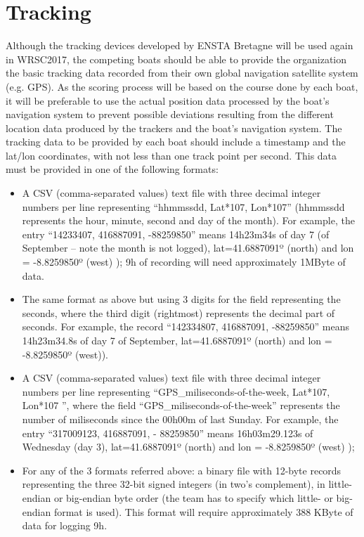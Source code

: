 \documentclass[12pt]{article}
\begin{document}
\section{Tracking}
Although the tracking devices developed by ENSTA Bretagne will be used again in
WRSC2017, the competing boats should be able to provide the organization the basic
tracking data recorded from their own global navigation satellite system (e.g. GPS). As the scoring
process will be based on the course done by each boat, it will be preferable to use the actual
position data processed by the boat’s navigation system to prevent possible deviations
resulting from the different location data produced by the trackers and the boat’s navigation
system.
The tracking data to be provided by each boat should include a timestamp and the
lat/lon coordinates, with not less than one track point per second. This data must be
provided in one of the following formats:
\begin{itemize}
  \item A CSV (comma-separated values) text file with three decimal integer numbers
per line representing “hhmmssdd, Lat*107, Lon*107” (hhmmssdd represents the hour,
minute, second and day of the month). For example, the entry “14233407,
416887091, -88259850” means 14h23m34s of day 7 (of September – note the month
is not logged), lat=41.6887091º (north) and lon = -8.8259850º (west) ); 9h of
recording will need approximately 1MByte of data.
  \item The same format as above but using 3 digits for the field representing the
seconds, where the third digit (rightmost) represents the decimal part of seconds. For
example, the record “142334807, 416887091, -88259850” means 14h23m34.8s of day 7
of September, lat=41.6887091º (north) and lon = -8.8259850º (west)).
 \item A CSV (comma-separated values) text file with three decimal integer numbers
per line representing “GPS\_miliseconds-of-the-week, Lat*107, Lon*107
”, where the field “GPS\_miliseconds-of-the-week” represents the number of miliseconds since
the 00h00m of last Sunday. For example, the entry “317009123, 416887091, -
88259850” means 16h03m29.123s of Wednesday (day 3), lat=41.6887091º (north) and
lon = -8.8259850º (west) );
 \item For any of the 3 formats referred above: a binary file with 12-byte records
representing the three 32-bit signed integers (in two’s complement), in little-endian or
big-endian byte order (the team has to specify which little- or big-endian format is used).
This format will require approximately 388 KByte of data for logging 9h.
\end{itemize}
\end{document}
